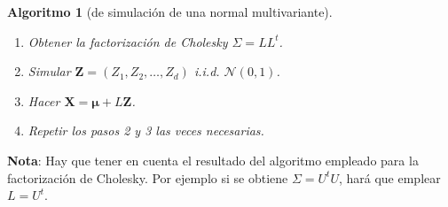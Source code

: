 \documentclass[
]{book}
\theoremstyle{break}
\newtheorem{conjecture}{Algoritmo}[chapter]
\theoremstyle{nonumberplain}
\begin{document}
\begin{conjecture}[de simulación de una normal multivariante]
\protect\hypertarget{cnj:mnorm-fact}{}\label{cnj:mnorm-fact}

\begin{enumerate}
\def\labelenumi{\arabic{enumi}.}
\item
  Obtener la factorización de Cholesky \(\Sigma=LL^t\).
\item
  Simular \(\mathbf{Z} =\left( Z_1,Z_2,\ldots,Z_d\right)\)
  i.i.d. \(\mathcal{N}\left( 0,1\right)\).
\item
  Hacer \(\mathbf{X} = \boldsymbol\mu + L\mathbf{Z}\).
\item
  Repetir los pasos 2 y 3 las veces necesarias.
\end{enumerate}

\end{conjecture}

\textbf{Nota}: Hay que tener en cuenta el resultado del algoritmo empleado
para la factorización de Cholesky. Por ejemplo si se obtiene \(\Sigma=U^tU\),
hará que emplear \(L=U^t.\)
\end{document}
